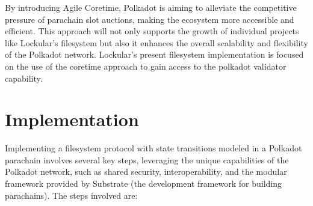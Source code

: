\documentclass{tufte-handout}
\begin{document}
By introducing Agile Coretime, Polkadot is aiming to alleviate the competitive pressure of parachain slot auctions, making the ecosystem more
accessible and efficient. This approach will not only supports the growth of individual projects like Lockular's filesystem but also it 
enhances the overall scalability and flexibility of the Polkadot network. Lockular's present filesystem implementation is focused on the use
of the coretime approach to gain access to the polkadot validator capability.

\section{Implementation}
Implementing a filesystem protocol with state transitions modeled in a Polkadot parachain involves several key steps, leveraging the unique
capabilities of the Polkadot network, such as shared security, interoperability, and the modular framework provided by Substrate (the
development framework for building parachains). The steps involved are:
\end{document}
